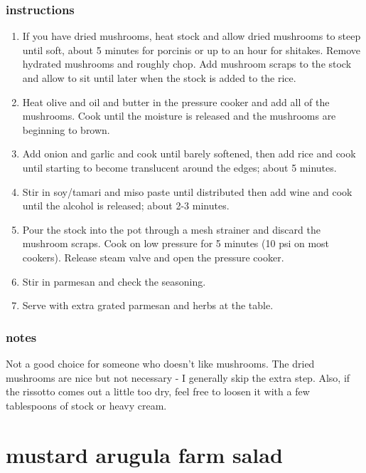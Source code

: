 \documentclass[]{book}
\providecommand{\tightlist}{%
  \setlength{\itemsep}{0pt}\setlength{\parskip}{0pt}}
\begin{document}
\hypertarget{instructions-9}{%
\subsection{instructions}\label{instructions-9}}

\begin{enumerate}
\def\labelenumi{\arabic{enumi}.}
\tightlist
\item
  If you have dried mushrooms, heat stock and allow dried mushrooms to steep until soft, about 5 minutes for
  porcinis or up to an hour for shitakes. Remove hydrated mushrooms and roughly chop. Add mushroom scraps to the stock
  and allow to sit until later when the stock is added to the rice.
\item
  Heat olive and oil and butter in the pressure cooker and add all of the mushrooms. Cook until the moisture is
  released and the mushrooms are beginning to brown.
\item
  Add onion and garlic and cook until barely softened, then add rice and cook until starting to become translucent
  around the edges; about 5 minutes.
\item
  Stir in soy/tamari and miso paste until distributed then add wine and cook until the alcohol is released; about
  2-3 minutes.
\item
  Pour the stock into the pot through a mesh strainer and discard the mushroom scraps. Cook on low pressure for 5
  minutes (10 psi on most cookers). Release steam valve and open the pressure cooker.
\item
  Stir in parmesan and check the seasoning.
\item
  Serve with extra grated parmesan and herbs at the table.
\end{enumerate}

\hypertarget{notes-9}{%
\subsection{notes}\label{notes-9}}

Not a good choice for someone who doesn't like mushrooms. The dried mushrooms are nice but not necessary - I
generally skip the extra step. Also, if the rissotto comes out a little too dry, feel free to loosen it with a
few tablespoons of stock or heavy cream.

\hypertarget{mustard-arugula-farm-salad}{%
\chapter{mustard arugula farm salad}\label{mustard-arugula-farm-salad}}
\end{document}

